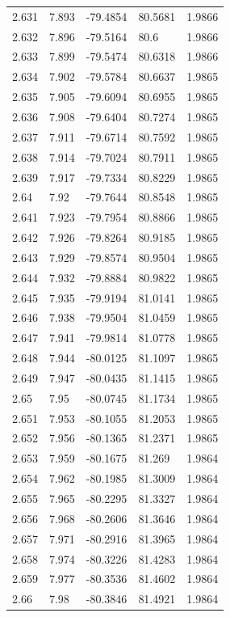 \begin{tabular}{lllll}
2.631 & 7.893 & -79.4854 & 80.5681 & 1.9866 \\
2.632 & 7.896 & -79.5164 & 80.6 & 1.9866 \\
2.633 & 7.899 & -79.5474 & 80.6318 & 1.9866 \\
2.634 & 7.902 & -79.5784 & 80.6637 & 1.9865 \\
2.635 & 7.905 & -79.6094 & 80.6955 & 1.9865 \\
2.636 & 7.908 & -79.6404 & 80.7274 & 1.9865 \\
2.637 & 7.911 & -79.6714 & 80.7592 & 1.9865 \\
2.638 & 7.914 & -79.7024 & 80.7911 & 1.9865 \\
2.639 & 7.917 & -79.7334 & 80.8229 & 1.9865 \\
2.64 & 7.92 & -79.7644 & 80.8548 & 1.9865 \\
2.641 & 7.923 & -79.7954 & 80.8866 & 1.9865 \\
2.642 & 7.926 & -79.8264 & 80.9185 & 1.9865 \\
2.643 & 7.929 & -79.8574 & 80.9504 & 1.9865 \\
2.644 & 7.932 & -79.8884 & 80.9822 & 1.9865 \\
2.645 & 7.935 & -79.9194 & 81.0141 & 1.9865 \\
2.646 & 7.938 & -79.9504 & 81.0459 & 1.9865 \\
2.647 & 7.941 & -79.9814 & 81.0778 & 1.9865 \\
2.648 & 7.944 & -80.0125 & 81.1097 & 1.9865 \\
2.649 & 7.947 & -80.0435 & 81.1415 & 1.9865 \\
2.65 & 7.95 & -80.0745 & 81.1734 & 1.9865 \\
2.651 & 7.953 & -80.1055 & 81.2053 & 1.9865 \\
2.652 & 7.956 & -80.1365 & 81.2371 & 1.9865 \\
2.653 & 7.959 & -80.1675 & 81.269 & 1.9864 \\
2.654 & 7.962 & -80.1985 & 81.3009 & 1.9864 \\
2.655 & 7.965 & -80.2295 & 81.3327 & 1.9864 \\
2.656 & 7.968 & -80.2606 & 81.3646 & 1.9864 \\
2.657 & 7.971 & -80.2916 & 81.3965 & 1.9864 \\
2.658 & 7.974 & -80.3226 & 81.4283 & 1.9864 \\
2.659 & 7.977 & -80.3536 & 81.4602 & 1.9864 \\
2.66 & 7.98 & -80.3846 & 81.4921 & 1.9864 \\

\end{tabular}
